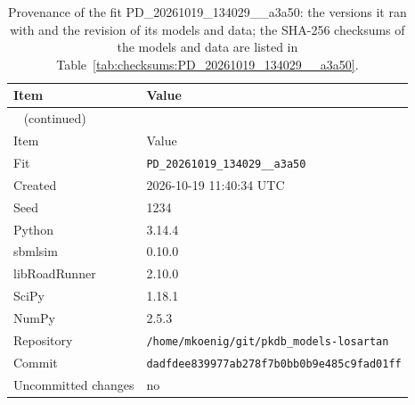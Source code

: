 \begin{longtable}{ll}
\caption{Provenance of the fit PD\_20261019\_134029\_\_a3a50: the versions it ran with and the revision of its models and data; the SHA-256 checksums of the models and data are listed in Table~\ref{tab:checksums:PD_20261019_134029__a3a50}.}\label{tab:provenance:PD_20261019_134029__a3a50} \\
\toprule
Item & Value \\
\midrule
\endfirsthead
\multicolumn{2}{l}{\small\tablename~\thetable{} (continued)} \\
\toprule
Item & Value \\
\midrule
\endhead
\bottomrule
\endlastfoot
Fit & \texttt{PD\_20261019\_134029\_\_a3a50} \\
Created & 2026-10-19 11:40:34 UTC \\
Seed & 1234 \\
Python & 3.14.4 \\
sbmlsim & 0.10.0 \\
libRoadRunner & 2.10.0 \\
SciPy & 1.18.1 \\
NumPy & 2.5.3 \\
Repository & \texttt{/home/mkoenig/git/pkdb\_models-losartan} \\
Commit & \texttt{dadfdee839977ab278f7b0bb0b9e485c9fad01ff} \\
Uncommitted changes & no \\
\end{longtable}



